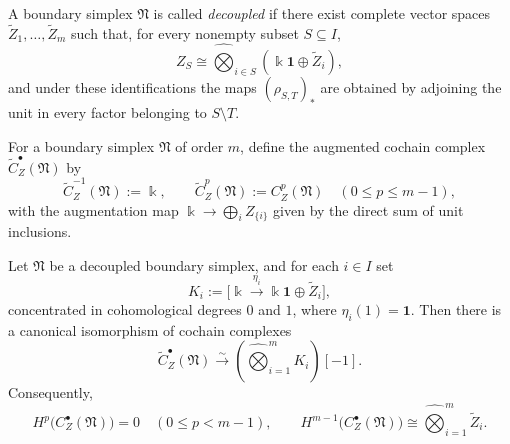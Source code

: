 \begin{definition}
A boundary simplex $\mathfrak N$ is called \emph{decoupled} if there exist complete vector spaces
$\widetilde Z_1,\dots,\widetilde Z_m$ such that, for every nonempty subset $S\subseteq I$,
\[
Z_S\cong \widehat\bigotimes_{i\in S}(\Bbbk\mathbf{1}\oplus \widetilde Z_i),
\]
and under these identifications the maps $(\rho_{S,T})_*$ are obtained by adjoining the unit in every
factor belonging to $S\setminus T$.
\end{definition}

\begin{definition}
For a boundary simplex $\mathfrak N$ of order $m$, define the augmented cochain complex
$\widetilde C_Z^\bullet(\mathfrak N)$ by
\[
\widetilde C_Z^{-1}(\mathfrak N):=\Bbbk,
\qquad
\widetilde C_Z^p(\mathfrak N):=C_Z^p(\mathfrak N)\quad (0\le p\le m-1),
\]
with the augmentation map $\Bbbk\to \bigoplus_i Z_{\{i\}}$ given by the direct sum of unit inclusions.
\end{definition}

\begin{theorem}
Let $\mathfrak N$ be a decoupled boundary simplex, and for each $i\in I$ set
\[
K_i:=\bigl[\Bbbk\xrightarrow{\eta_i} \Bbbk\mathbf{1}\oplus \widetilde Z_i\bigr],
\]
concentrated in cohomological degrees $0$ and $1$, where $\eta_i(1)=\mathbf{1}$.
Then there is a canonical isomorphism of cochain complexes
\[
\widetilde C_Z^\bullet(\mathfrak N)
\xrightarrow{\sim}
\left(\widehat\bigotimes_{i=1}^m K_i\right)[-1].
\]
Consequently,
\[
H^p\bigl(C_Z^\bullet(\mathfrak N)\bigr)=0
\quad (0\le p<m-1),
\qquad
H^{m-1}\bigl(C_Z^\bullet(\mathfrak N)\bigr)
\cong
\widehat\bigotimes_{i=1}^m \widetilde Z_i.
\]
\end{theorem}

